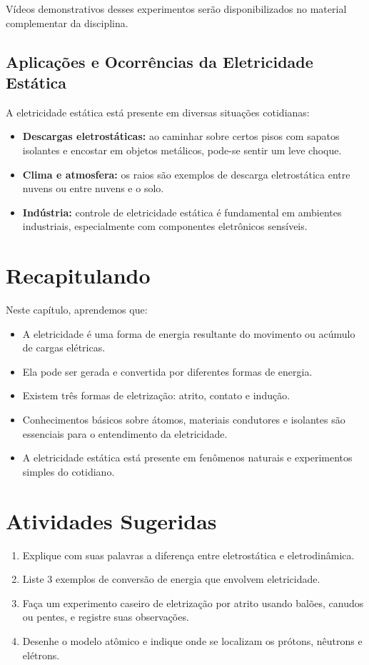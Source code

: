 Vídeos demonstrativos desses experimentos serão disponibilizados no material complementar da disciplina.

\subsection{Aplicações e Ocorrências da Eletricidade Estática}
A eletricidade estática está presente em diversas situações cotidianas:

\begin{itemize}
    \item \textbf{Descargas eletrostáticas:} ao caminhar sobre certos pisos com sapatos isolantes e encostar em objetos metálicos, pode-se sentir um leve choque.
    \item \textbf{Clima e atmosfera:} os raios são exemplos de descarga eletrostática entre nuvens ou entre nuvens e o solo.
    \item \textbf{Indústria:} controle de eletricidade estática é fundamental em ambientes industriais, especialmente com componentes eletrônicos sensíveis.
\end{itemize}

\section{Recapitulando}
Neste capítulo, aprendemos que:

\begin{itemize}
    \item A eletricidade é uma forma de energia resultante do movimento ou acúmulo de cargas elétricas.
    \item Ela pode ser gerada e convertida por diferentes formas de energia.
    \item Existem três formas de eletrização: atrito, contato e indução.
    \item Conhecimentos básicos sobre átomos, materiais condutores e isolantes são essenciais para o entendimento da eletricidade.
    \item A eletricidade estática está presente em fenômenos naturais e experimentos simples do cotidiano.
\end{itemize}

\section{Atividades Sugeridas}
\begin{enumerate}
    \item Explique com suas palavras a diferença entre eletrostática e eletrodinâmica.
    \item Liste 3 exemplos de conversão de energia que envolvem eletricidade.
    \item Faça um experimento caseiro de eletrização por atrito usando balões, canudos ou pentes, e registre suas observações.
    \item Desenhe o modelo atômico e indique onde se localizam os prótons, nêutrons e elétrons.
\end{enumerate}


